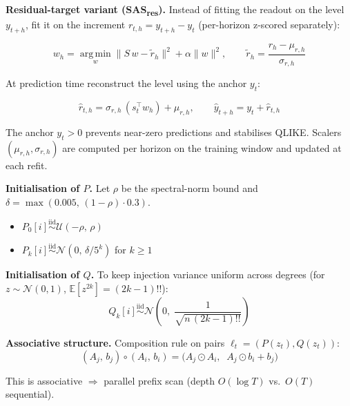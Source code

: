 \documentclass[11pt, a4paper]{article}
\newcommand{\W}{w}
\begin{document}
\textbf{Residual-target variant (SAS\textsubscript{res}).}
Instead of fitting the readout on the level $y_{t+h}$, fit it on the
increment $r_{t,h} = y_{t+h} - y_t$ (per-horizon z-scored separately):

\begin{equation}
  \W_h = \operatorname*{arg\,min}_{w}
         \bigl\|S\,w - \tilde{r}_h\bigr\|^2 + \alpha\|w\|^2,
  \qquad \tilde{r}_h = \frac{r_h - \mu_{r,h}}{\sigma_{r,h}}
\end{equation}

At prediction time reconstruct the level using the anchor $y_t$:

\begin{equation}
  \hat{r}_{t,h} = \sigma_{r,h}\,(s_t^\top \W_h) + \mu_{r,h},
  \qquad \hat{y}_{t+h} = y_t + \hat{r}_{t,h}
\end{equation}

The anchor $y_t > 0$ prevents near-zero predictions and stabilises QLIKE.
Scalers $(\mu_{r,h}, \sigma_{r,h})$ are computed per horizon on the training
window and updated at each refit.

\textbf{Initialisation of $P$.}
Let $\rho$ be the spectral-norm bound and $\delta = \max(0.005,\,(1{-}\rho)\cdot 0.3)$.
\begin{itemize}\itemsep1pt
  \item $P_0[i] \overset{\text{iid}}{\sim} \mathcal{U}(-\rho,\,\rho)$
  \item $P_k[i] \overset{\text{iid}}{\sim} \mathcal{N}(0,\,\delta/5^k)$
        for $k \geq 1$
\end{itemize}

\textbf{Initialisation of $Q$.}
To keep injection variance uniform across degrees (for $z \sim \mathcal{N}(0,1)$,
$\mathbb{E}[z^{2k}] = (2k-1)!!$):
\begin{equation}
  Q_k[i] \overset{\text{iid}}{\sim}
  \mathcal{N}\!\left(0,\;\frac{1}{\sqrt{n\,(2k-1)!!}}\right)
\end{equation}

\textbf{Associative structure.} Composition rule on pairs $\ell_t = (P(z_t),Q(z_t))$:
\begin{equation}
  (A_j,\,b_j) \circ (A_i,\,b_i) =
  \bigl(A_j \odot A_i,\;\;A_j \odot b_i + b_j\bigr)
\end{equation}

This is associative $\Rightarrow$ parallel prefix scan (depth $O(\log T)$
vs.\ $O(T)$ sequential).
\end{document}

